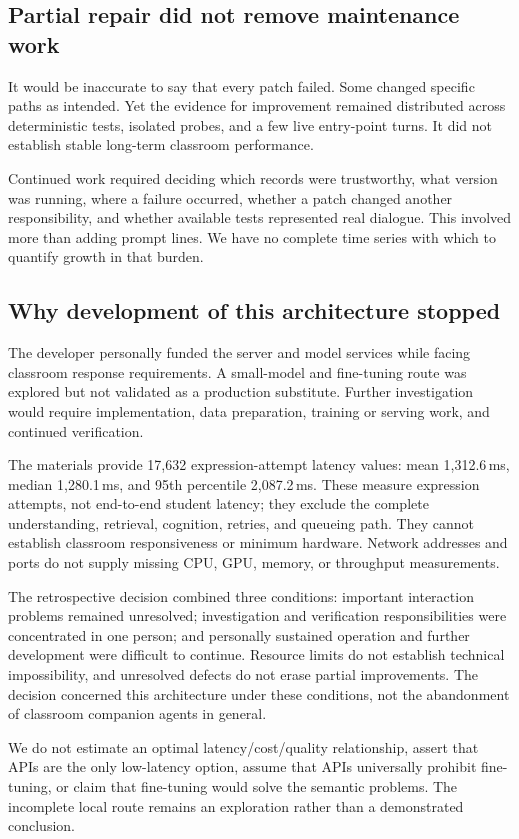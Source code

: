 \documentclass[11pt,a4paper]{article}
\begin{document}
\subsection{Partial repair did not remove maintenance work}
It would be inaccurate to say that every patch failed. Some changed specific paths as intended. Yet the evidence for improvement remained distributed across deterministic tests, isolated probes, and a few live entry-point turns. It did not establish stable long-term classroom performance.

Continued work required deciding which records were trustworthy, what version was running, where a failure occurred, whether a patch changed another responsibility, and whether available tests represented real dialogue. This involved more than adding prompt lines. We have no complete time series with which to quantify growth in that burden.

\subsection{Why development of this architecture stopped}
The developer personally funded the server and model services while facing classroom response requirements. A small-model and fine-tuning route was explored but not validated as a production substitute. Further investigation would require implementation, data preparation, training or serving work, and continued verification.

The materials provide 17,632 expression-attempt latency values: mean 1,312.6\,ms, median 1,280.1\,ms, and 95th percentile 2,087.2\,ms. These measure expression attempts, not end-to-end student latency; they exclude the complete understanding, retrieval, cognition, retries, and queueing path. They cannot establish classroom responsiveness or minimum hardware. Network addresses and ports do not supply missing CPU, GPU, memory, or throughput measurements.

The retrospective decision combined three conditions: important interaction problems remained unresolved; investigation and verification responsibilities were concentrated in one person; and personally sustained operation and further development were difficult to continue. Resource limits do not establish technical impossibility, and unresolved defects do not erase partial improvements. The decision concerned this architecture under these conditions, not the abandonment of classroom companion agents in general.

We do not estimate an optimal latency/cost/quality relationship, assert that APIs are the only low-latency option, assume that APIs universally prohibit fine-tuning, or claim that fine-tuning would solve the semantic problems. The incomplete local route remains an exploration rather than a demonstrated conclusion.
\end{document}
